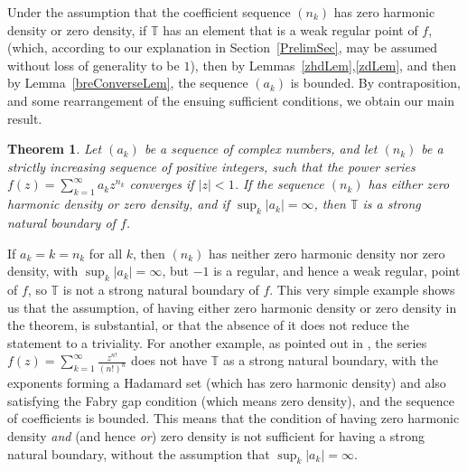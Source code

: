 \documentclass[11pt,a4paper]{article}
\newcommand{\T}{\mathbb{T}}
\newtheorem{theorem}{Theorem}[section]
\begin{document}
Under the assumption that the coefficient sequence $(n_k)$ has zero harmonic density or zero density, if $\T$ has an element that is a weak regular point of $f$, (which, according to our explanation in Section~\ref{PrelimSec}, may be assumed without loss of generality to be $1$), then by Lemmas~\ref{zhdLem},\ref{zdLem}, and then by Lemma~\ref{breConverseLem}, the sequence $(a_k)$ is bounded. By contraposition, and some rearrangement of the ensuing sufficient conditions, we obtain our main result.
\begin{theorem} Let $(a_k)$ be a sequence of complex numbers, and let $(n_k)$ be a strictly increasing sequence of positive integers, such that the power series $f(z)=\sum_{k=1}^\infty a_kz^{n_k}$ converges if $|z|<1$. If the sequence $(n_k)$ has either zero harmonic density or zero density, and if $\sup_k|a_k|=\infty$, then $\T$ is a strong natural boundary of $f$.
\end{theorem}
If $a_k=k=n_k$ for all $k$, then $(n_k)$ has neither zero harmonic density nor zero density, with $\sup_k|a_k|=\infty$, but $-1$ is a regular, and hence a weak regular, point of $f$, so $\T$ is not a strong natural boundary of $f$. This very simple example shows us that the assumption, of having either zero harmonic density or zero density in the theorem, is substantial, or that the absence of it does not reduce the statement to a triviality. For another example, as pointed out in \cite[p.~4905]{bre11}, the series $f(z)=\sum_{k=1}^\infty\frac{z^{n!}}{(n!)^n}$ \cite[Equation~(1.9)]{bre11} does not have $\T$ as a strong natural boundary, with the exponents forming a Hadamard set (which has zero harmonic density) and also satisfying the Fabry gap condition (which means zero density), and the sequence of coefficients is bounded. This means that the condition of having zero harmonic density \emph{and} (and hence \emph{or}) zero density is not sufficient for having a strong natural boundary, without the assumption that $\sup_k|a_k|=\infty$.
\end{document}

